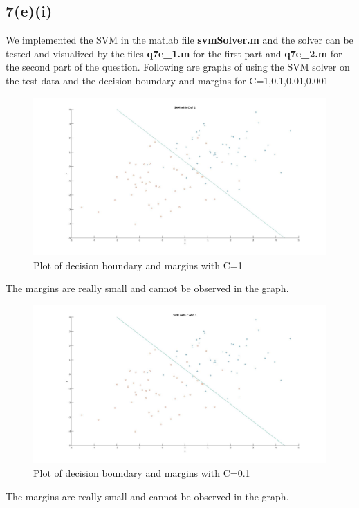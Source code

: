\subsection*{7(e)(i)}
We implemented the SVM in the matlab file \textbf{svmSolver.m} and the solver can be tested and visualized by the files \textbf{q7e\_1.m} for the first part and \textbf{q7e\_2.m} for the second part of the question.
Following are graphs of using the SVM solver on the test data and the decision boundary and margins for C=1,0.1,0.01,0.001
\begin{figure}[H]
\centering
\includegraphics[width=6.5in]{figures/q7-5-3.jpg}
\caption{Plot of decision boundary and margins with C=1}
\end{figure}
The margins are really small and cannot be observed in the graph.
\begin{figure}[H]
\centering
\includegraphics[width=6.5in]{figures/q7-5-2.jpg}
\caption{Plot of decision boundary and margins with C=0.1}
\end{figure}
The margins are really small and cannot be observed in the graph.
